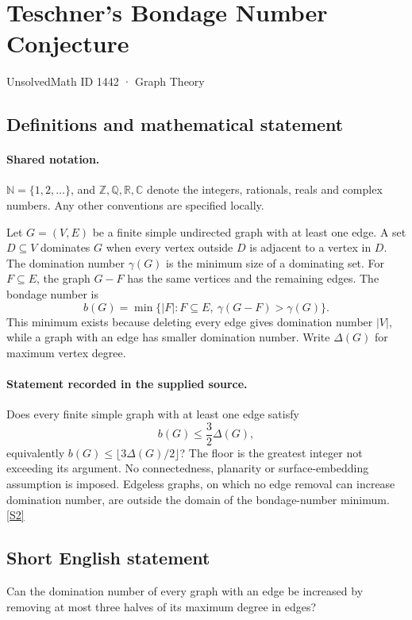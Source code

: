 \documentclass[11pt]{article}
\newcommand{\sref}[2]{\hyperlink{source:#1:#2}{[S#2]}}
\begin{document}
\setcounter{section}{1441}
\section{Teschner's Bondage Number Conjecture}\label{1442}
{\small\sffamily UnsolvedMath ID 1442 · Graph Theory}
\subsection{Definitions and mathematical statement}

\paragraph{Shared notation.}$\mathbb N=\{1,2,\ldots\}$, and $\mathbb Z,\mathbb Q,\mathbb R,\mathbb C$ denote the integers, rationals, reals and complex numbers. Any other conventions are specified locally.


Let $G=(V,E)$ be a finite simple undirected graph with at least one edge. A set $D\subseteq V$ dominates $G$ when every vertex outside $D$ is adjacent to a vertex in $D$. The domination number $\gamma(G)$ is the minimum size of a dominating set. For $F\subseteq E$, the graph $G-F$ has the same vertices and the remaining edges. The bondage number is
\[
 b(G)=\min\{|F|:F\subseteq E,\ \gamma(G-F)>\gamma(G)\}.
\]
This minimum exists because deleting every edge gives domination number $|V|$, while a graph with an edge has smaller domination number. Write $\Delta(G)$ for maximum vertex degree.
\paragraph{Statement recorded in the supplied source.}
Does every finite simple graph with at least one edge satisfy
\[
 b(G)\le\frac32\Delta(G),
\]
equivalently $b(G)\le\lfloor3\Delta(G)/2\rfloor$? The floor is the greatest integer not exceeding its argument. No connectedness, planarity or surface-embedding assumption is imposed. Edgeless graphs, on which no edge removal can increase domination number, are outside the domain of the bondage-number minimum. \sref{1442}{2}
\subsection{Short English statement}
Can the domination number of every graph with an edge be increased by removing at most three halves of its maximum degree in edges?
\end{document}
